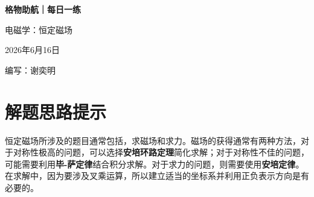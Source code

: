 \documentclass[11pt,a4paper]{ctexart}
\begin{document}
\begin{center}
  {\Large\bfseries\color{mainblue} 格物助航｜每日一练}\par
  \vspace{0.25em}
  {\large 电磁学：恒定磁场}\par
  \vspace{0.35em}
  {\small 2026年6月16日}\par
  \vspace{0.35em}
  {\small 编写：谢奕明}
\end{center}

\vspace{-0.3em}

\section*{解题思路提示}
\begin{tipBox}
恒定磁场所涉及的题目通常包括，求磁场和求力。磁场的获得通常有两种方法，对于对称性极高的问题，可以选择\textbf{安培环路定理}简化求解；对于对称性不佳的问题，可能需要利用\textbf{毕-萨定律}结合积分求解。对于求力的问题，则需要使用\textbf{安培定律}。在求解中，因为要涉及叉乘运算，所以建立适当的坐标系并利用正负表示方向是有必要的。
\end{tipBox}
\end{document}

